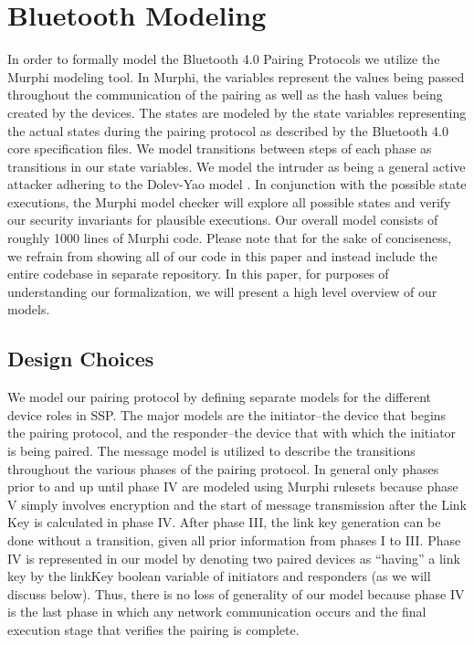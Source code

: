 \documentclass{acm_proc_article-sp}
\begin{document}
\section{Bluetooth Modeling}
In order to formally model the Bluetooth 4.0 Pairing Protocols we utilize the Murphi modeling tool. In Murphi, the variables represent the values being passed throughout the communication of the pairing as well as the hash values being created by the devices. The states are modeled by the state variables representing the actual states during the pairing protocol as described by the Bluetooth 4.0 core specification files. We model transitions between steps of each phase as transitions in our state variables. We model the intruder as being a general active attacker adhering to the Dolev-Yao model \cite{dolev:yao}. In conjunction with the possible state executions, the Murphi model checker will explore all possible states and verify our security invariants for plausible executions. Our overall model consists of roughly 1000 lines of Murphi code. Please note that for the sake of conciseness, we refrain from showing all of our code in this paper and instead include the entire codebase in separate repository. In this paper, for purposes of understanding our formalization, we will present a high level overview of our models.

\subsection{Design Choices}
We model our pairing protocol by defining separate models for the different device roles in SSP. The major models are the initiator--the device that begins the pairing protocol, and the responder--the device that with which the initiator is being paired. The message model is utilized to describe the transitions throughout the various phases of the pairing protocol. In general only phases prior to and up until phase IV are modeled using Murphi rulesets because phase V simply involves encryption and the start of message transmission after the Link Key is calculated in phase IV. After phase III, the link key generation can be done without a transition, given all prior information from phases I to III. Phase IV is represented in our model by denoting two paired devices as ``having'' a link key by the linkKey boolean variable of initiators and responders (as we will discuss below). Thus, there is no loss of generality of our model because phase IV is the last phase in which any network communication occurs and the final execution stage that verifies the pairing is complete.
\end{document}
